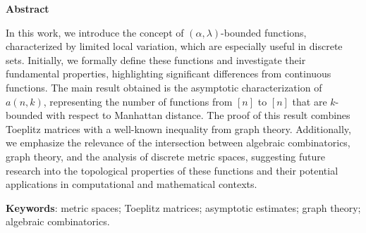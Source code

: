 \begin{center}
  \large \textbf{Abstract}
\end{center}
\vspace{1cm}
\par In this work, we introduce the concept of $(\alpha, \lambda)$-bounded functions, characterized by limited local variation, which are especially useful in discrete sets. Initially, we formally define these functions and investigate their fundamental properties, highlighting significant differences from continuous functions. The main result obtained is the asymptotic characterization of $a(n, k)$, representing the number of functions from $[n]$ to $[n]$ that are $k$-bounded with respect to Manhattan distance. The proof of this result combines Toeplitz matrices with a well-known inequality from graph theory. Additionally, we emphasize the relevance of the intersection between algebraic combinatorics, graph theory, and the analysis of discrete metric spaces, suggesting future research into the topological properties of these functions and their potential applications in computational and mathematical contexts.

\vspace{1cm}

\begin{raggedleft}
  \textbf{Keywords}: metric spaces; Toeplitz matrices; asymptotic estimates; graph theory; algebraic combinatorics.
\end{raggedleft}
